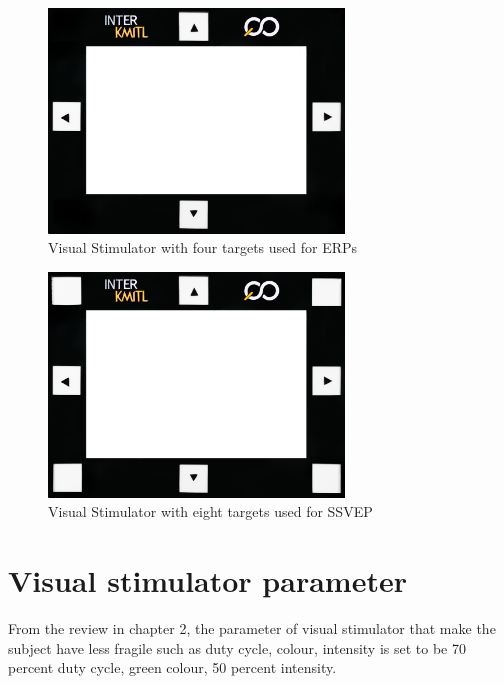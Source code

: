 \begin{figure}[ht]
	\centering
	\includegraphics[width=0.7\textwidth]{chapter7/frame_4.jpg}
	\caption{Visual Stimulator with four targets used for ERPs}
\end{figure}

\begin{figure}[ht]
	\centering
	\includegraphics[width=0.7\textwidth]{chapter7/frame_8.jpg}
	\caption{Visual Stimulator with eight targets used for SSVEP}
\end{figure}

\section{Visual stimulator parameter}
From the review in chapter 2, the parameter of visual stimulator that make the subject have less fragile such as duty cycle, colour, intensity is set to be 70 percent duty cycle, green colour, 50 percent intensity. 